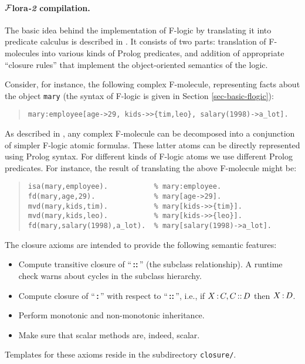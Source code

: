 \documentclass[11pt]{article}
\newcommand{\isa}{\,{\bf{:}}\,}
\newcommand{\subcl}{\,{\bf{::}}\,}
\newcommand{\FLORA}{{\mbox{${\cal F}${\sc lora}\rm\emph{-2}}}\xspace}
\newcommand{\fl}{\mbox{F-logic}\xspace}
\begin{document}
\paragraph{\FLORA compilation.}
The basic idea behind the implementation of \fl by translating it into
predicate calculus is described in \cite{KLW95}. It consists of two parts:
translation of F-molecules into various kinds of Prolog predicates, and
addition of appropriate ``closure rules'' that implement the
object-oriented semantics of the logic.

Consider, for instance, the following complex F-molecule, representing
facts about the object \texttt{mary} (the syntax of \fl is given in
Section \ref{sec-basic-flogic}):

\begin{quote}
{\small\begin{verbatim}
mary:employee[age->29, kids->>{tim,leo}, salary(1998)->a_lot].
\end{verbatim}}
\end{quote}

As described in \cite{KLW95}, any complex F-molecule can be
decomposed into a conjunction of simpler \fl atomic formulas. These
latter atoms can be directly represented using Prolog syntax.  For
different kinds of \fl atoms we use different Prolog predicates. For
instance, the result of translating the above F-molecule might be:

\begin{quote}
{\small
\begin{verbatim}
isa(mary,employee).           % mary:employee.
fd(mary,age,29).              % mary[age->29].
mvd(mary,kids,tim).           % mary[kids->>{tim}].
mvd(mary,kids,leo).           % mary[kids->>{leo}].
fd(mary,salary(1998),a_lot).  % mary[salary(1998)->a_lot].
\end{verbatim}
  }
\end{quote}

The closure axioms are intended to provide the following semantic features:
\begin{itemize}
\item Compute transitive closure of ``\subcl'' (the subclass relationship).  A
  runtime check warns about cycles in the subclass hierarchy.
\item Compute closure of ``\isa'' with respect to ``\subcl'', i.e., if $X\isa C,
  C\subcl D$ then $X\isa D$.
\item Perform monotonic and non-monotonic inheritance.
\item Make sure that scalar methods are, indeed, scalar.
\end{itemize}
Templates for these axioms reside in the subdirectory \texttt{closure/}.
\end{document}
